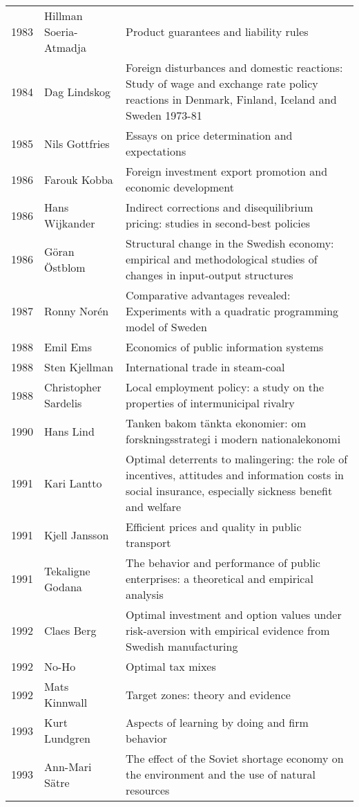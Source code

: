 {\begin{longtable}{p{} p{} p{}}
    1983 & Hillman Soeria-Atmadja & Product guarantees and liability rules \\
    1984 & Dag Lindskog & Foreign disturbances and domestic reactions: Study of wage and exchange rate policy reactions in Denmark, Finland, Iceland and Sweden 1973-81 \\
    1985 & Nils Gottfries & Essays on price determination and expectations \\
    1986 & Farouk Kobba & Foreign investment export promotion and economic development \\
    1986 & Hans Wijkander & Indirect corrections and disequilibrium pricing: studies in second-best policies \\
    1986 & Göran Östblom & Structural change in the Swedish economy: empirical and methodological studies of changes in input-output structures \\
    1987 & Ronny Norén & Comparative advantages revealed: Experiments with a quadratic programming model of Sweden \\
    1988 & Emil Ems & Economics of public information systems \\
    1988 & Sten Kjellman & International trade in steam-coal \\
    1988 & Christopher Sardelis & Local employment policy: a study on the properties of intermunicipal rivalry \\
    1990 & Hans Lind & Tanken bakom tänkta ekonomier: om forskningsstrategi i modern nationalekonomi \\
    1991 & Kari Lantto & Optimal deterrents to malingering: the role of incentives, attitudes and information costs in social insurance, especially sickness benefit and welfare \\
    1991 & Kjell Jansson & Efficient prices and quality in public transport \\
    1991 & Tekaligne Godana & The behavior and performance of public enterprises: a theoretical and empirical analysis \\
    1992 & Claes Berg & Optimal investment and option values under risk-aversion with empirical evidence from Swedish manufacturing \\
    1992 & No-Ho & Optimal tax mixes \\
    1992 & Mats Kinnwall & Target zones: theory and evidence \\
    1993 & Kurt Lundgren & Aspects of learning by doing and firm behavior \\
    1993 & Ann-Mari Sätre & The effect of the Soviet shortage economy on the environment and the use of natural resources \\

\end{longtable}}
